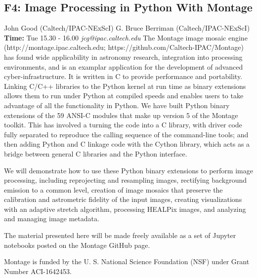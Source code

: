 \documentclass{report}
\begin{document}
\subsection*{F4: Image Processing in Python With Montage}
\bigskip
John Good (Caltech/IPAC-NExScI) \newline G. Bruce Berriman (Caltech/IPAC-NExScI) \newline   \newline   \newline  \newline  \newline\newline
{\bf Time:} Tue 15.30 - 16.00\newline
\newline
{\it jcg@ipac.caltech.edu}\newline
\newline\newline
The Montage image mosaic engine (http://montage.ipac.caltech.edu; https://github.com/Caltech-IPAC/Montage) has found wide applicability in astronomy research, integration into processing environments, and is an examplar application for the development of advanced cyber-infrastructure. It is written in C to provide performance and portability.  Linking C/C++ libraries to the Python kernel at run time as binary extensions allows them to run under Python at compiled speeds and enables users to take advantage of all the functionality in Python.  We have built Python binary extensions of the 59 ANSI-C modules that make up version 5 of the Montage toolkit. This has involved a  turning the code into a C library, with driver code fully separated to reproduce the calling sequence of the command-line tools; and then adding Python and C linkage code with the Cython library, which acts as a bridge between general C libraries and the Python interface. 

We will demonstrate how to use these Python binary extensions to perform image processing, including reprojecting and resampling images, rectifying background emission to a common level, creation of image mosaics that preserve the calibration and astrometric fidelity of the input images, creating visualizations with an adaptive stretch algorithm, processing HEALPix images, and analyzing and managing image metadata.

The material presented here will be made freely available as a set of Jupyter notebooks posted on the Montage GitHub page.

Montage is funded by the U. S. National Science Foundation (NSF)  under Grant Number ACI-1642453.\newline
\newpage
\end{document}
